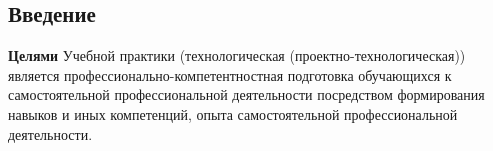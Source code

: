 \documentclass[a4paper,12pt]{article} %
\begin{document}
\setcounter{page}{2} %
\newpage 
\begin{center}
    \tableofcontents
\end{center}
\newpage 
\newpage
\setcounter{subsection}{0}
\setcounter{equation}{0}
\setcounter{section}{0}
\begin{center}
\section*{Введение}
\end{center}
\par \textbf{Целями} Учебной практики (технологическая (проектно-технологическая)) является профессионально-компетентностная подготовка обучающихся к самостоятельной профессиональной деятельности посредством формирования навыков и иных компетенций, опыта самостоятельной профессиональной деятельности. 
\end{document}
